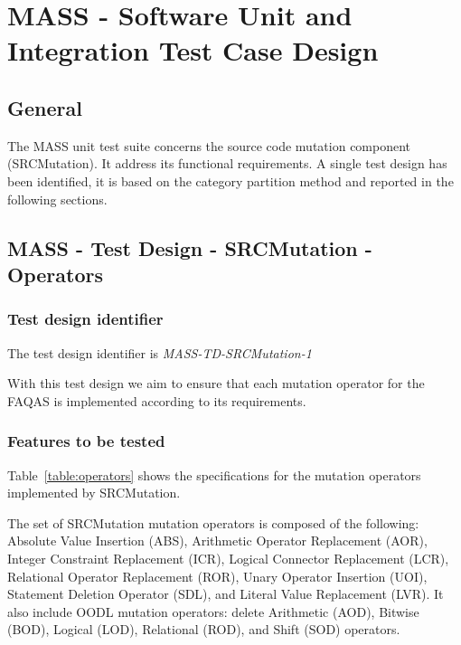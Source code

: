 
\chapter{MASS - Software Unit and Integration Test Case Design}
\label{chap:spec}


\section{General}

The MASS unit test suite concerns the source code mutation component (SRCMutation). It address its functional requirements. A single test design has been identified, it is based on the category partition method and reported in the following sections.



\section{MASS - Test Design - SRCMutation - Operators}

\subsection{Test design identifier}

The test design identifier is \emph{MASS-TD-SRCMutation-1}

With this test design we aim to ensure that each mutation operator for the FAQAS is implemented according to its requirements.

\subsection{Features to be tested}

Table~\ref{table:operators} shows the specifications for the mutation operators implemented by SRCMutation.

The set of SRCMutation mutation operators is composed of the following: Absolute Value Insertion (ABS), Arithmetic Operator Replacement (AOR), Integer Constraint Replacement (ICR), Logical Connector Replacement (LCR), Relational Operator Replacement (ROR), Unary Operator Insertion (UOI), Statement Deletion Operator (SDL), and Literal Value Replacement (LVR).
It also include OODL mutation operators: delete Arithmetic (AOD), Bitwise (BOD), Logical (LOD), Relational (ROD), and Shift (SOD) operators.




